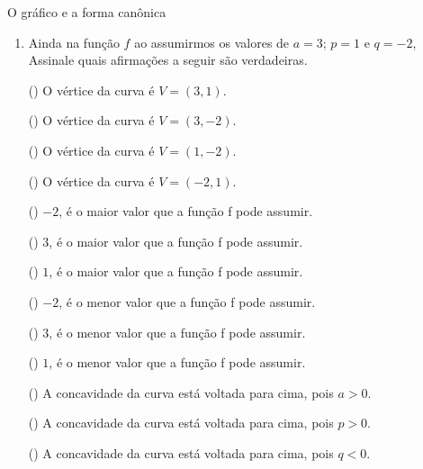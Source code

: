 \begin{task}{O gráfico e a forma canônica}
\begin{enumerate}
\item {} 
Ainda na função \(f\) ao assumirmos os valores de \(a=3\);  \(p=1\) e \(q=-2\), Assinale quais afirmações a seguir são verdadeiras.

(\phantom{x}) O vértice da curva é \(V=(3,1)\).

(\phantom{x}) O vértice da curva é \(V=(3,-2)\).

(\phantom{x}) O vértice da curva é \(V=(1,-2)\).

(\phantom{x}) O vértice da curva é \(V=(-2,1)\).

(\phantom{x}) \(-2\), é o maior valor que a função f pode assumir.

(\phantom{x}) \(3\), é o maior valor que a função f pode assumir.

(\phantom{x}) \(1\), é o maior valor que a função f pode assumir.

(\phantom{x}) \(-2\), é o menor valor que a função f pode assumir.

(\phantom{x}) \(3\), é o menor valor que a função f pode assumir.

(\phantom{x}) \(1\), é o menor valor que a função f pode assumir.

(\phantom{x}) A concavidade da curva está voltada para cima, pois \(a>0\).

(\phantom{x}) A concavidade da curva está voltada para cima, pois \(p>0\).

(\phantom{x}) A concavidade da curva está voltada para cima, pois \(q<0\).

\end{enumerate}
\end{task}

\exercise
\label{\detokenize{AF209-5:exercicios}}

